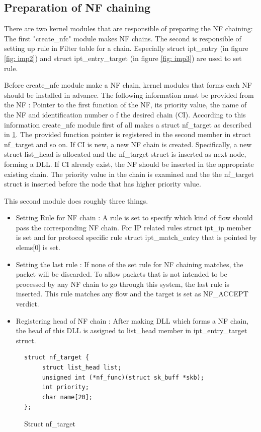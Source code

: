 \subsection{Preparation of NF chaining} 
There are two kernel modules that are responsible of preparing the NF chaining: The first "create\_nfc" module makes NF chains. The second is responsible of setting up rule in Filter table for a chain. Especially struct ipt\_entry (in figure \ref{fig: imp2}) and struct ipt\_entry\_target (in figure \ref{fig: imp3}) are used to set rule. 

Before create\_nfc module make a NF chain, kernel modules that forms each NF should be installed in advance. The following information must be provided from the NF : Pointer to the first function of the NF, its priority value, the name of the NF and identification number o f the desired chain (CI). According to this information create\_nfc module first of all makes a struct nf\_target as described in \ref{fig: imp1}. The provided function pointer is registered in the second member in struct nf\_target and so on. If CI is new, a new NF chain is created. Specifically, a new struct list\_head is allocated and the nf\_target struct is inserted as next node, forming a DLL. If CI already exist, the NF should be inserted in the appropriate existing chain. The priority value in the chain is examined and the the nf\_target struct is inserted before the node that has higher priority value.

This second module does roughly three things. 
\begin{itemize}
	\item Setting Rule for NF chain : A rule is set to specify which kind of flow should pass the corresponding NF chain. For IP related rules struct ipt\_ip member is set and for protocol specific rule struct ipt\_match\_entry that is pointed by elems[0] is set. 
	\item Setting the last rule : If none of the set rule for NF chaining matches, the packet will be discarded. To allow packets that is not intended to be processed by any NF chain to go through this system, the last rule is inserted. This rule matches any flow and the target is set as NF\_ACCEPT verdict. 
	\item Registering head of NF chain : After making DLL which forms a NF chain, the head of this DLL is assigned to list\_head member in ipt\_entry\_target struct. 
\end{itemize}

\begin{figure}
	\begin{center}
		\begin{screen}
			\begin{verbatim}
struct nf_target {
     struct list_head list;
     unsigned int (*nf_func)(struct sk_buff *skb);
     int priority;
     char name[20];
};
			\end{verbatim}	
		\end{screen}
	\end{center}	
	\caption{Struct nf\_target}
	\label{fig: imp1}
\end{figure}

